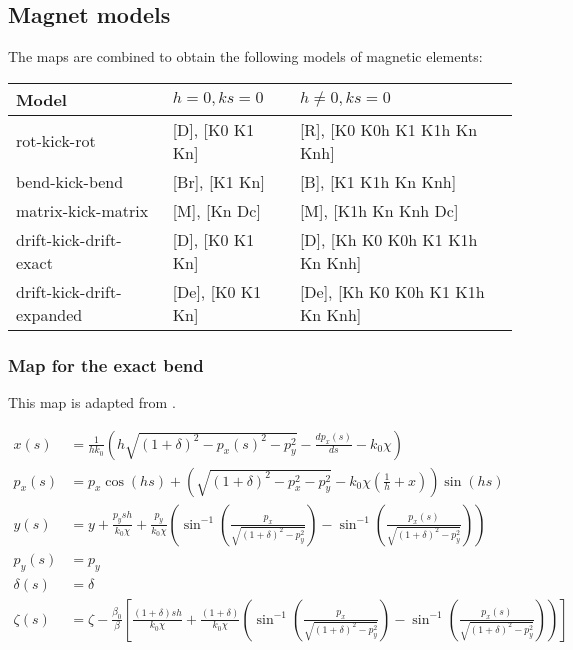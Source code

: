 \subsection{Magnet models}
The maps are combined to obtain the following models of magnetic elements:\\

\begin{tabular}{lll}
\toprule
\textbf{Model} & $h=0, ks=0$ & $h\neq0, ks=0$ \\
\midrule
rot-kick-rot & [D], [K0 K1 Kn] & [R], [K0 K0h K1 K1h Kn Knh] \\
bend-kick-bend & [Br],  [K1 Kn] & [B], [K1 K1h Kn Knh] \\
matrix-kick-matrix & [M], [Kn Dc] & [M], [K1h Kn Knh Dc] \\
drift-kick-drift-exact & [D], [K0 K1 Kn] & [D], [Kh K0 K0h K1 K1h Kn Knh] \\
drift-kick-drift-expanded & [De], [K0 K1 Kn] & [De], [Kh K0 K0h K1 K1h Kn Knh] \\
\bottomrule
\end{tabular}

\subsubsection{Map for the exact bend}

This map is adapted from \cite{forest99}.

\begin{align}
x(s) &= \frac{1}{hk_0} \left( h \sqrt{(1 + \delta)^2 - p_x(s)^2 - p_y^2} - \frac{dp_x(s)}{ds} - k_0 \chi \right) \\
p_x(s) &= p_x \cos(h s) + \left( \sqrt{(1 + \delta)^2 - p_x^2 - p_y^2} - k_0 \chi \left( \frac{1}{h} + x \right) \right) \sin(h s) \\
y(s) &= y + \frac{p_y s h}{k_0 \chi} + \frac{p_y}{k_0 \chi} \left( \sin^{-1} \left( \frac{p_x}{\sqrt{(1 + \delta)^2 - p_y^2}} \right) - \sin^{-1} \left( \frac{p_x(s)}{\sqrt{(1 + \delta)^2 - p_y^2}} \right) \right) \\
p_y(s) &= p_y \\
\delta(s) &= \delta \\
\zeta(s) &= \zeta -\frac{\beta_0}{\beta}
  \left[
  \frac{(1 + \delta) s h}{k_0 \chi} + \frac{(1 + \delta)}{k_0 \chi} \left( \sin^{-1} \left( \frac{p_x}{\sqrt{(1 + \delta)^2 - p_y^2}} \right) - \sin^{-1} \left( \frac{p_x(s)}{\sqrt{(1 + \delta)^2 - p_y^2}} \right) \right)
  \right]
\end{align}

